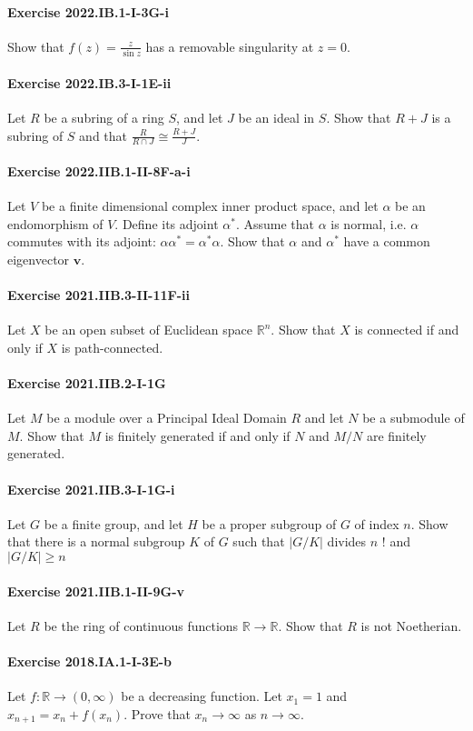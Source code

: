 \documentclass{article}
\begin{document}
\paragraph{Exercise 2022.IB.1-I-3G-i} Show that $f(z)=\frac{z}{\sin z}$ has a removable singularity at $z=0$.

\paragraph{Exercise 2022.IB.3-I-1E-ii} Let $R$ be a subring of a ring $S$, and let $J$ be an ideal in $S$. Show that $R+J$ is a subring of $S$ and that $\frac{R}{R \cap J} \cong \frac{R+J}{J}$.

\paragraph{Exercise 2022.IIB.1-II-8F-a-i} Let $V$ be a finite dimensional complex inner product space, and let $\alpha$ be an endomorphism of $V$. Define its adjoint $\alpha^*$. Assume that $\alpha$ is normal, i.e. $\alpha$ commutes with its adjoint: $\alpha \alpha^*=\alpha^* \alpha$. Show that $\alpha$ and $\alpha^*$ have a common eigenvector $\mathbf{v}$.

\paragraph{Exercise 2021.IIB.3-II-11F-ii} Let $X$ be an open subset of Euclidean space $\mathbb{R}^n$. Show that $X$ is connected if and only if $X$ is path-connected.

\paragraph{Exercise 2021.IIB.2-I-1G} Let $M$ be a module over a Principal Ideal Domain $R$ and let $N$ be a submodule of $M$. Show that $M$ is finitely generated if and only if $N$ and $M / N$ are finitely generated.

\paragraph{Exercise 2021.IIB.3-I-1G-i} Let $G$ be a finite group, and let $H$ be a proper subgroup of $G$ of index $n$. Show that there is a normal subgroup $K$ of $G$ such that $|G / K|$ divides $n$ ! and $|G / K| \geqslant n$

\paragraph{Exercise 2021.IIB.1-II-9G-v} Let $R$ be the ring of continuous functions $\mathbb{R}\to\mathbb{R}$. Show that $R$ is not Noetherian.

\paragraph{Exercise 2018.IA.1-I-3E-b} Let $f: \mathbb{R} \rightarrow(0, \infty)$ be a decreasing function. Let $x_{1}=1$ and $x_{n+1}=x_{n}+f\left(x_{n}\right)$. Prove that $x_{n} \rightarrow \infty$ as $n \rightarrow \infty$.
\end{document}
